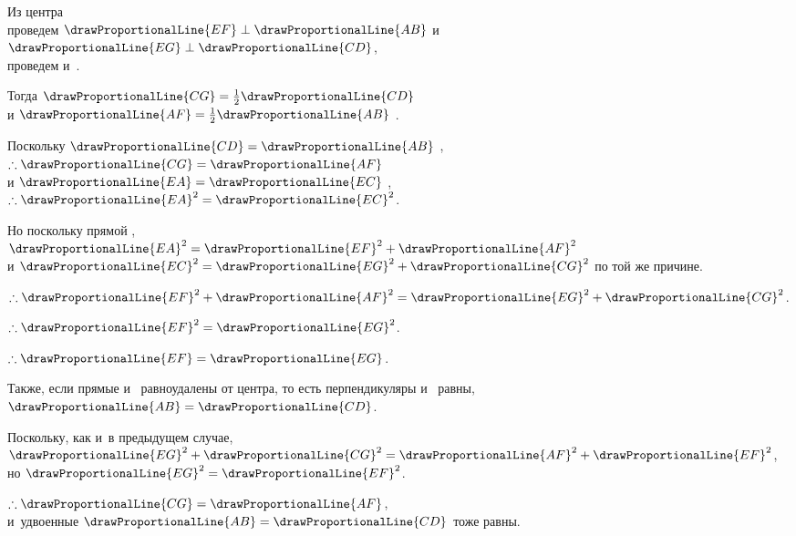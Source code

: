 \documentclass[letters,booklanguage=russian]{byrnebook}
\begin{document}
\begin{center}
Из центра \\
проведем $\drawProportionalLine{EF} \perp \drawProportionalLine{AB}$ и~$\drawProportionalLine{EG} \perp \drawProportionalLine{CD}$,\\
проведем  и~.

Тогда $\drawProportionalLine{CG} = \frac{1}{2} \drawProportionalLine{CD}$ \\
и $\drawProportionalLine{AF} = \frac{1}{2} \drawProportionalLine{AB}$ .

Поскольку $\drawProportionalLine{CD} = \drawProportionalLine{AB}$ \byref{\hypref},\\
$\therefore \drawProportionalLine{CG} = \drawProportionalLine{AF}$ \\
и $\drawProportionalLine{EA} = \drawProportionalLine{EC}$ ,\\
$\therefore \drawProportionalLine{EA}^2 = \drawProportionalLine{EC}^2$.

Но поскольку  прямой \byref{\constref},\\
$\drawProportionalLine{EA}^2 = \drawProportionalLine{EF}^2 + \drawProportionalLine{AF}^2$ \\
и $\drawProportionalLine{EC}^2 = \drawProportionalLine{EG}^2 + \drawProportionalLine{CG}^2$ по той же причине.

$\therefore \drawProportionalLine{EF}^2 + \drawProportionalLine{AF}^2 = \drawProportionalLine{EG}^2 + \drawProportionalLine{CG}^2$.

$\therefore \drawProportionalLine{EF}^2 = \drawProportionalLine{EG}^2$.

$\therefore \drawProportionalLine{EF} = \drawProportionalLine{EG}$.
\end{center}

Также, если прямые  и~ равноудалены от центра, то есть перпендикуляры  и~ равны, $\drawProportionalLine{AB} = \drawProportionalLine{CD}$.

\begin{center}
Поскольку, как и~в предыдущем случае,\\
$\drawProportionalLine{EG}^2 + \drawProportionalLine{CG}^2 = \drawProportionalLine{AF}^2 + \drawProportionalLine{EF}^2$,\\
но $\drawProportionalLine{EG}^2 = \drawProportionalLine{EF}^2$.

$\therefore \drawProportionalLine{CG} = \drawProportionalLine{AF}$,\\
и~удвоенные $\drawProportionalLine{AB} = \drawProportionalLine{CD}$ тоже равны.
\end{center}
\end{document}
